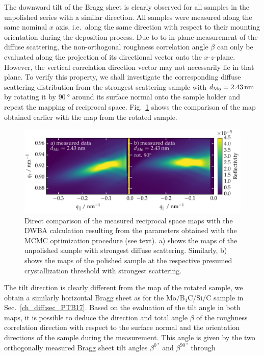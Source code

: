 The downward tilt of the Bragg sheet is clearly observed for all samples in the unpolished series with a similar direction. All samples were measured along the same nominal $x$ axis, i.e.~along the same direction with respect to their mounting orientation during the deposition process. Due to to in-plane measurement of the diffuse scattering, the non-orthogonal roughness correlation angle $\beta$ can only be evaluated along the projection of its directional vector onto the $x$-$z$-plane. However, the vertical correlation direction vector may not necessarily lie in that plane. To verify this property, we shall investigate the corresponding diffuse scattering distribution from the strongest scattering sample with $d_\text{Mo} = \nm{2.43}$ by rotating it by $\SI{90}{\degree}$ around its surface normal onto the sample holder and repeat the mapping of reciprocal space. Fig.~\ref{ch_diff:fig_diffuse_tilt_vs_notilt} shows the comparison of the map obtained earlier with the map from the rotated sample.
\begin{figure}[htbp]
\centering
\includegraphics[width=\textwidth]{img/MoSiC_diffuse_tilt_vs_notilt}
\caption{Direct comparison of the measured reciprocal space maps with the DWBA calculation resulting from the parameters obtained with the MCMC optimization procedure (see text). a) shows the maps of the unpolished sample with strongest diffuse scattering. Similarly, b) shows the maps of the polished sample at the respective presumed crystallization threshold with strongest scattering.}
\label{ch_diff:fig_diffuse_tilt_vs_notilt}
\end{figure}
The tilt direction is clearly different from the map of the rotated sample, we obtain a similarly horizontal Bragg sheet as for the Mo/B$_4$C/Si/C sample in Sec.~\ref{ch_diff:sec_PTB17}. Based on the evaluation of the tilt angle in both maps, it is possible to deduce the direction and total angle $\beta$ of the roughness correlation direction with respect to the surface normal and the orientation directions of the sample during the measurement. This angle is given by the two orthogonally measured Bragg sheet tilt angles $\beta^{\SI{0}{\degree}}$ and $\beta^{\SI{90}{\degree}}$ through
